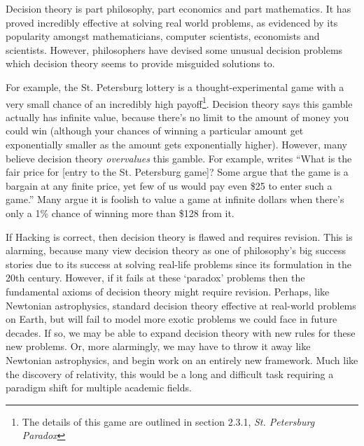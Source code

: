 \documentclass{article}
\begin{document}
Decision theory is part philosophy, part economics and part mathematics. It has proved incredibly effective at solving real world problems, as evidenced by its popularity amongst mathematicians, computer scientists, economists and scientists. However, philosophers have devised some unusual decision problems which decision theory seems to provide misguided solutions to. 

For example, the St. Petersburg lottery is a thought-experimental game with a very small chance of an incredibly high payoff\footnote{The details of this game are outlined in section 2.3.1, \textit{St. Petersburg Paradox}}. Decision theory says this gamble actually has infinite value, because there's no limit to the amount of money you could win (although your chances of winning a particular amount get exponentially smaller as the amount gets exponentially higher). However, many believe decision theory \textit{overvalues} this gamble. For example, \citep{hacking1980strange} writes ``What is the fair price for [entry to the St. Petersburg game]? Some argue that the game is a bargain at any finite price, yet few of us would pay even \$25 to enter such a game.'' Many argue it is foolish to value a game at infinite dollars when there's only a 1\% chance of winning more than \$128 from it.

If Hacking is correct, then decision theory is flawed and requires revision. This is alarming, because many view decision theory as one of philosophy's big success stories due to its success at solving real-life problems since its formulation in the 20th century. However, if it fails at these `paradox' problems then the fundamental axioms of decision theory might require revision. Perhaps, like Newtonian astrophysics, standard decision theory effective at real-world problems on Earth, but will fail to model more exotic problems we could face in future decades. If so, we may be able to expand decision theory with new rules for these new problems. Or, more alarmingly, we may have to throw it away like Newtonian astrophysics, and begin work on an entirely new framework. Much like the discovery of relativity, this would be a long and difficult task requiring a paradigm shift for multiple academic fields.
\end{document}
